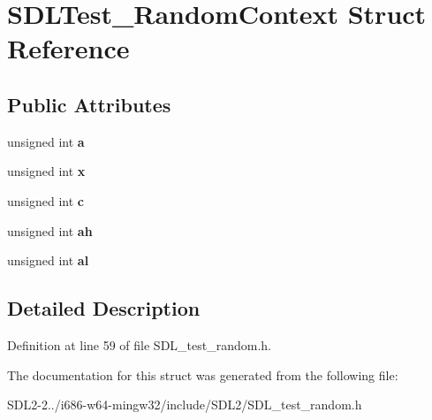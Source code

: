 \hypertarget{structSDLTest__RandomContext}{\section{S\+D\+L\+Test\+\_\+\+Random\+Context Struct Reference}
\label{structSDLTest__RandomContext}
}
\subsection*{Public Attributes}
\begin{DoxyCompactItemize}
\item 
\hypertarget{structSDLTest__RandomContext_a24f830d6cb476c96fbe325c99331e45f}{unsigned int {\bfseries a}}\label{structSDLTest__RandomContext_a24f830d6cb476c96fbe325c99331e45f}

\item 
\hypertarget{structSDLTest__RandomContext_a8bd6d1b4e1677ed1c06f5cc09f1af5b6}{unsigned int {\bfseries x}}\label{structSDLTest__RandomContext_a8bd6d1b4e1677ed1c06f5cc09f1af5b6}

\item 
\hypertarget{structSDLTest__RandomContext_a17a6a7e7b68a33c67d9b74c8c7c33198}{unsigned int {\bfseries c}}\label{structSDLTest__RandomContext_a17a6a7e7b68a33c67d9b74c8c7c33198}

\item 
\hypertarget{structSDLTest__RandomContext_a2c8d2f1ee16cdfd38361b8f03b3fdb85}{unsigned int {\bfseries ah}}\label{structSDLTest__RandomContext_a2c8d2f1ee16cdfd38361b8f03b3fdb85}

\item 
\hypertarget{structSDLTest__RandomContext_a0e2bccd3611d383d6510c6c828aa54c4}{unsigned int {\bfseries al}}\label{structSDLTest__RandomContext_a0e2bccd3611d383d6510c6c828aa54c4}

\end{DoxyCompactItemize}


\subsection{Detailed Description}


Definition at line 59 of file S\+D\+L\+\_\+test\+\_\+random.\+h.



The documentation for this struct was generated from the following file\+:\begin{DoxyCompactItemize}
\item 
S\+D\+L2-\/2../i686-\/w64-\/mingw32/include/\+S\+D\+L2/S\+D\+L\+\_\+test\+\_\+random.\+h\end{DoxyCompactItemize}
